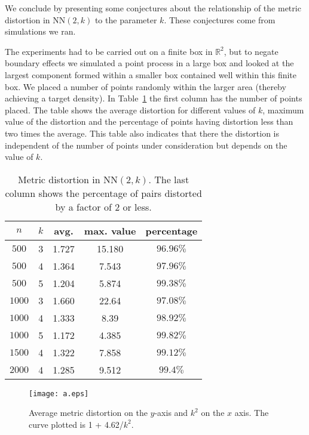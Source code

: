\documentclass[11pt]{article}
\def\RR{\mathbb{R}}
\def\NN{\mbox{NN}}
\begin{document}
We conclude by presenting some conjectures about the relationship of
the metric distortion in $\NN(2,k)$ to the parameter $k$. These
conjectures come from simulations we ran.

The experiments had to be carried out on a finite box in $\RR^2$, but
to negate boundary effects we simulated a point process in a large box
and looked at the largest component formed within a smaller box
contained well within this finite box. We placed a number of points
randomly within the larger area (thereby achieving a target
density). In 
Table~\ref{tab:metric-distortion} the first column has the number of
points placed. The table shows the average distortion for different
values of $k$, maximum value of the distortion and the 
percentage of points having distortion less than two times the
average. This table also indicates that there the distortion is
independent of the number of points under consideration but depends on
the value of $k$.

\begin{table}
\begin{center}
\begin{tabular}{|c|cccc|}
\hline
  $n$& $k$ & avg.& max. value & percentage \\
\hline
  $ 500 $& 3& 1.727& 15.180& $96.96\%$\\
\hline
  $ 500 $& 4& 1.364& 7.543& $97.96\%$\\
\hline
  $ 500 $& 5& 1.204& 5.874& $99.38\%$\\
\hline
  $ 1000 $& 3& 1.660& 22.64& $97.08\%$\\
\hline
  $ 1000 $& 4& 1.333& 8.39& $98.92\%$\\
\hline
  $ 1000 $& 5& 1.172& 4.385& $99.82\%$\\
\hline
  $ 1500 $& 4& 1.322& 7.858& $99.12\%$\\
\hline
  $ 2000 $& 4& 1.285& 9.512& $99.4\%$\\
\hline
\end{tabular}
\end{center}
\label{tab:metric-distortion}
\caption{Metric distortion in $\NN(2,k)$. The last column shows the
  percentage of pairs distorted by a factor of 2 or less.}
\end {table}



\begin{figure}
  \begin{center}
    \texttt{[image: a.eps]}
   \end{center}
\label{fig:plot-k-1}
\caption{Average metric distortion on the $y$-axis and $k^2$ on the
  $x$ axis. The curve plotted is 1 + 4.62/$k^2$.}
\end{figure}
\end{document}
